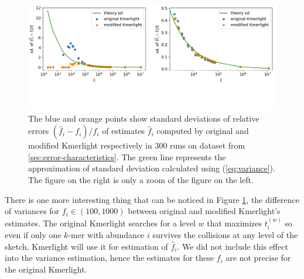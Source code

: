 \begin{figure}[h]
\centerline{\includegraphics[width=1\textwidth, trim={0cm, 3.1cm, 0cm, 0cm}, clip]{images/std_deviations_comparison_theory2.png}}
\caption[Experimental and theoretical variance of Kmerlight]{The blue and orange points show 
standard deviations of relative errors $(\hat f_i - f_i) / f_i$ of estimates $\hat f_i$
computed by original and modified Kmerlight respectively in 300 runs on dataset from 
\ref{sec:error-characteristics}. The green line represents the approximation of standard
deviation calculated using (\ref{eq:variance}). The figure on the right is only a zoom of the figure
on the left.}
\label{img:std-theory}
\end{figure}

There is one more interesting thing that can be noticed in Figure \ref{img:std-theory},
the difference of variances for $f_i \in (100, 1000)$ between original and modified Kmerlight's
estimates. The original Kmerlight searches for a level $w$ that maximizes $t_i^{(w)}$ so
even if only one $k$-mer with abundance $i$ survives the collisions at any level of the sketch, 
Kmerlight will use it for estimation of $\hat f_i$. We did not include this effect into the
variance estimation, hence the estimates for these $f_i$ are not precise for the original Kmerlight.
